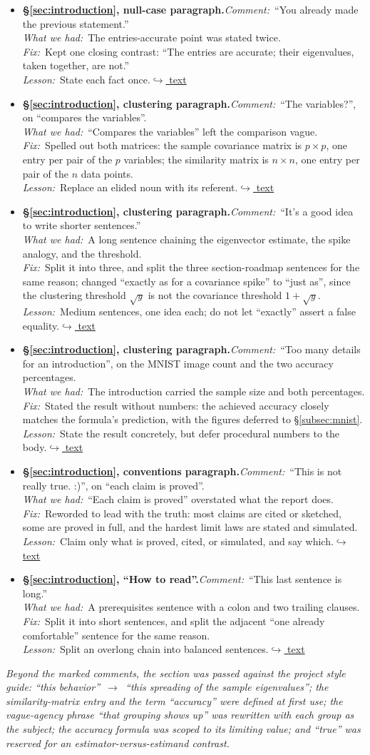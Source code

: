 \documentclass[12pt]{article}
\newcommand{\gdlogentry}[6]{%
  \item[\textcolor{thesisRev}{$\star$\,\ref{gdrev:#1}}]\hypertarget{gdlog:#1}{}%
  \textbf{#2.}\enspace\emph{Comment:}~#3\\
  \emph{What we had:}~#4\\
  \emph{Fix:}~#5\\
  \emph{Lesson:}~#6\enspace\hyperlink{gdtext:#1}{\textcolor{thesisLink}{$\hookrightarrow$ text}}}
\begin{document}
\begin{itemize}[leftmargin=2.4em,itemsep=0.55em]
\gdlogentry{intro-repeat}{\S\ref{sec:introduction}, null-case paragraph}{``You already made the previous statement.''}{The entries-accurate point was stated twice.}{Kept one closing contrast: ``The entries are accurate; their eigenvalues, taken together, are not.''}{State each fact once.}

\gdlogentry{intro-variables}{\S\ref{sec:introduction}, clustering paragraph}{``The variables?'', on ``compares the variables''.}{``Compares the variables'' left the comparison vague.}{Spelled out both matrices: the sample covariance matrix is \(p \times p\), one entry per pair of the \(p\) variables; the similarity matrix is \(n \times n\), one entry per pair of the \(n\) data points.}{Replace an elided noun with its referent.}

\gdlogentry{intro-shorten}{\S\ref{sec:introduction}, clustering paragraph}{``It's a good idea to write shorter sentences.''}{A long sentence chaining the eigenvector estimate, the spike analogy, and the threshold.}{Split it into three, and split the three section-roadmap sentences for the same reason; changed ``exactly as for a covariance spike'' to ``just as'', since the clustering threshold \(\sqrt{y}\) is not the covariance threshold \(1+\sqrt{y}\).}{Medium sentences, one idea each; do not let ``exactly'' assert a false equality.}

\gdlogentry{intro-mnist}{\S\ref{sec:introduction}, clustering paragraph}{``Too many details for an introduction'', on the MNIST image count and the two accuracy percentages.}{The introduction carried the sample size and both percentages.}{Stated the result without numbers: the achieved accuracy closely matches the formula's prediction, with the figures deferred to \S\ref{subsec:mnist}.}{State the result concretely, but defer procedural numbers to the body.}

\gdlogentry{intro-proved}{\S\ref{sec:introduction}, conventions paragraph}{``This is not really true. :)'', on ``each claim is proved''.}{``Each claim is proved'' overstated what the report does.}{Reworded to lead with the truth: most claims are cited or sketched, some are proved in full, and the hardest limit laws are stated and simulated.}{Claim only what is proved, cited, or simulated, and say which.}

\gdlogentry{intro-longsentence}{\S\ref{sec:introduction}, ``How to read''}{``This last sentence is long.''}{A prerequisites sentence with a colon and two trailing clauses.}{Split it into short sentences, and split the adjacent ``one already comfortable'' sentence for the same reason.}{Split an overlong chain into balanced sentences.}
\end{itemize}

\smallskip
\noindent\emph{Beyond the marked comments, the section was passed against the project style guide: ``this behavior''~$\to$~``this spreading of the sample eigenvalues''; the similarity-matrix entry and the term ``accuracy'' were defined at first use; the vague-agency phrase ``that grouping shows up'' was rewritten with each group as the subject; the accuracy formula was scoped to its limiting value; and ``true'' was reserved for an estimator-versus-estimand contrast.}
\fi
\end{document}
